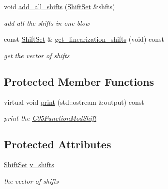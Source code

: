 \begin{DoxyCompactItemize}
\mbox{\label{class_s_m_spp__di__unipi__it_1_1_c05_function_mod_shift_a83035c010c17c901e88db5aa98b321ee}} 
void \mbox{\hyperlink{class_s_m_spp__di__unipi__it_1_1_c05_function_mod_shift_a83035c010c17c901e88db5aa98b321ee}{add\+\_\+all\+\_\+shifts}} (\mbox{\hyperlink{class_s_m_spp__di__unipi__it_1_1_c05_function_mod_shift_a2ff0fedb58393e9ed307342d2e5d781a}{Shift\+Set}} \&shfts)
\begin{DoxyCompactList}\small\item\em add all the shifts in one blow \end{DoxyCompactList}\item 
const \mbox{\hyperlink{class_s_m_spp__di__unipi__it_1_1_c05_function_mod_shift_a2ff0fedb58393e9ed307342d2e5d781a}{Shift\+Set}} \& \mbox{\hyperlink{class_s_m_spp__di__unipi__it_1_1_c05_function_mod_shift_a8788457eb4fee71415bf9750f650bfc6}{get\+\_\+linearization\+\_\+shifts}} (void) const
\begin{DoxyCompactList}\small\item\em get the vector of shifts \end{DoxyCompactList}\end{DoxyCompactItemize}
\subsection*{Protected Member Functions}
\begin{DoxyCompactItemize}
\item 
\mbox{\label{class_s_m_spp__di__unipi__it_1_1_c05_function_mod_shift_a2e7b9c9148a98c5c342e8c25cac95926}} 
virtual void \mbox{\hyperlink{class_s_m_spp__di__unipi__it_1_1_c05_function_mod_shift_a2e7b9c9148a98c5c342e8c25cac95926}{print}} (std\+::ostream \&output) const
\begin{DoxyCompactList}\small\item\em print the \mbox{\hyperlink{class_s_m_spp__di__unipi__it_1_1_c05_function_mod_shift}{C05\+Function\+Mod\+Shift}} \end{DoxyCompactList}\end{DoxyCompactItemize}
\subsection*{Protected Attributes}
\begin{DoxyCompactItemize}
\item 
\mbox{\label{class_s_m_spp__di__unipi__it_1_1_c05_function_mod_shift_a1f876575a63de9897f7122ee0dcabb06}} 
\mbox{\hyperlink{class_s_m_spp__di__unipi__it_1_1_c05_function_mod_shift_a2ff0fedb58393e9ed307342d2e5d781a}{Shift\+Set}} \mbox{\hyperlink{class_s_m_spp__di__unipi__it_1_1_c05_function_mod_shift_a1f876575a63de9897f7122ee0dcabb06}{v\+\_\+shifts}}
\begin{DoxyCompactList}\small\item\em the vector of shifts \end{DoxyCompactList}\end{DoxyCompactItemize}
